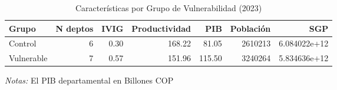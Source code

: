 \documentclass[12pt]{article}
\begin{document}
\setcounter{table}{4}
\begin{table}[htbp]
\centering
\begin{threeparttable}

\caption{Características por Grupo de Vulnerabilidad (2023)}
\begin{tabular}[t]{lrrrrrr}
\toprule
Grupo & N deptos & IVIG & Productividad & PIB & Población & SGP\\
\midrule
Control & 6 & 0.30 & 168.22 & 81.05 & 2610213 & 6.084022e+12\\
Vulnerable & 7 & 0.57 & 151.96 & 115.50 & 3240264 & 5.834636e+12\\
\bottomrule
\end{tabular}
\begin{tablenotes}
\footnotesize
\item \textit{Notas:} El PIB departamental en Billones COP
\end{tablenotes}
\end{threeparttable}
\end{table}
\end{document}
